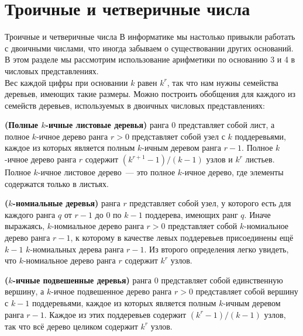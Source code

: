 \section{Троичные и четверичные числа}
\label{sc:9.4}

\begin{frame}{Троичные и четверичные числа}
В информатике мы настолько привыкли работать с двоичными числами, что
иногда забываем о существовании других оснований. В этом разделе мы
рассмотрим использование арифметики по основанию 3 и 4 в числовых
представлениях.\\

Вес каждой цифры при основании $k$ равен $k^r$, так что нам нужны
семейства деревьев, имеющих такие размеры. Можно построить обобщения
для каждого из семейств деревьев, используемых в двоичных числовых
представлениях:
\end{frame}

\begin{frame}[fragile]{}

\begin{definition}\label{def:9.4}
  \textbf{(Полные $k$-ичные листовые деревья)}  ранга 0 представляет собой лист, а полное $k$-ичное
  дерево ранга $r > 0$ представляет собой узел с $k$ поддеревьями,
  каждое из которых является полным $k$-ичным деревом ранга
  $r-1$. Полное $k$-ичное дерево ранга $r$ содержит $(k^{r+1} - 1) /
  (k - 1)$ узлов и $k^r$ листьев. Полное $k$-ичное листовое дерево~---
  это полное $k$-ичное дерево, где элементы содержатся только в листьях.
\end{definition}

\begin{definition}\label{def:9.5}
  \textbf{($k$-номиальные деревья)}  ранга $r$ представляет собой узел, у
  которого есть для каждого ранга $q$ от $r-1$ до 0 по $k-1$
  поддерева, имеющих ранг $q$. Иначе выражаясь,
  $k$-номиальное дерево ранга $r > 0$ представляет собой
  $k$-номиальное дерево ранга $r-1$, к которому в качестве левых
  поддеревьев присоединены ещё $k-1$ $k$-номиальных дерева ранга
  $r-1$. Из второго определения легко увидеть, что $k$-номиальное
  дерево ранга $r$ содержит $k^r$ узлов.
\end{definition}
\end{frame}

\begin{frame}[fragile]{}
\begin{definition}\label{def:9.6}
  \textbf{($k$-ичные подвешенные деревья)}  ранга 0 представляет собой единственную
вершину, а $k$-ичное подвешенное дерево ранга $r > 0$ представляет
собой вершину с $k-1$ поддеревьями, каждое из которых является полным
$k$-ичным деревом ранга $r-1$. Каждое из этих поддеревьев содержит
$(k^r - 1) / (k - 1)$ узлов, так что всё дерево целиком содержит $k^r$ узлов.
\end{definition}
\end{frame}


